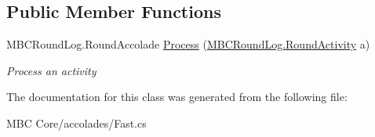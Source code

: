 \subsection*{Public Member Functions}
\begin{DoxyCompactItemize}
\item 
\hypertarget{class_m_b_c_core_1_1mbc_1_1accolades_1_1_fast_a9b127e6af364f46274a817836ae566bd}{M\-B\-C\-Round\-Log.\-Round\-Accolade \hyperlink{class_m_b_c_core_1_1mbc_1_1accolades_1_1_fast_a9b127e6af364f46274a817836ae566bd}{Process} (\hyperlink{class_m_b_c_core_1_1_m_b_c_round_log_1_1_round_activity}{M\-B\-C\-Round\-Log.\-Round\-Activity} a)}\label{class_m_b_c_core_1_1mbc_1_1accolades_1_1_fast_a9b127e6af364f46274a817836ae566bd}

\begin{DoxyCompactList}\small\item\em Process an activity\end{DoxyCompactList}\end{DoxyCompactItemize}


The documentation for this class was generated from the following file\-:\begin{DoxyCompactItemize}
\item 
M\-B\-C Core/accolades/Fast.\-cs\end{DoxyCompactItemize}
